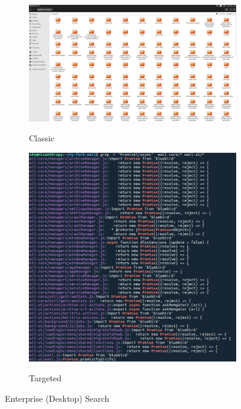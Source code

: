 \documentclass[11pt]{article}
\begin{document}
\begin{figure}[h]
	\begin{subfigure}{0.45\textwidth}
		\centering
		{\includegraphics[scale=0.3]{eSearch2.png}}
		\caption{Classic}
		\label{fig:cdeSearch}
	\end{subfigure}
	\vfill
	\begin{subfigure}{0.45\textwidth}
		\centering
		{\includegraphics[scale=0.5]{eSearch.png}}   
		\caption{Targeted}
		\label{fig:tdeSearch}
	\end{subfigure}
	\caption{Enterprise (Desktop) Search}
	\label{fig:esearch}
\end{figure}
\newpage
\clearpage
\end{document}
